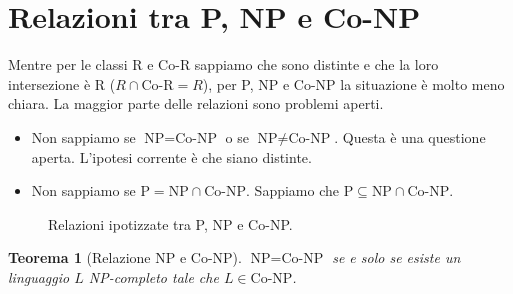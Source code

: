 \documentclass[a4paper]{article}
\newtheorem{theorem}{Teorema}
\begin{document}
\section{Relazioni tra P, NP e Co-NP}

Mentre per le classi R e Co-R sappiamo che sono distinte e che la loro intersezione è R ($R \cap \text{Co-R} = R$), per P, NP e Co-NP la situazione è molto meno chiara. La maggior parte delle relazioni sono problemi aperti.

\begin{itemize}
    \item Non sappiamo se $\text{NP} = \text{Co-NP}$ o se $\text{NP} \neq \text{Co-NP}$. Questa è una questione aperta. L'ipotesi corrente è che siano distinte.
    \item Non sappiamo se $\text{P} = \text{NP} \cap \text{Co-NP}$. Sappiamo che $\text{P} \subseteq \text{NP} \cap \text{Co-NP}$.
\end{itemize}

\begin{figure}[h]
\centering
{}
\caption{Relazioni ipotizzate tra P, NP e Co-NP.}
\end{figure}

\begin{theorem}[Relazione NP e Co-NP]
$\text{NP} = \text{Co-NP}$ se e solo se esiste un linguaggio $L$ NP-completo tale che $L \in \text{Co-NP}$.
\end{theorem}
\end{document}
